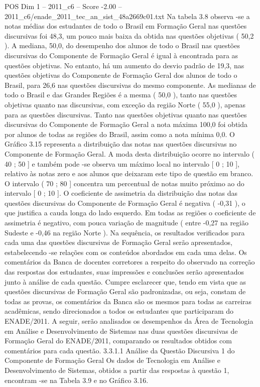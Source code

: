 \begin{textsample}{POS Dim 1 – 2011\_c6 – Score -2.00 – 2011\_c6/enade\_2011\_tec\_an\_sist\_48a2669c01.txt}
Na tabela 3.8 observa -se a notas médias dos estudantes de todo o Brasil em Formação Geral nas questões discursivas foi 48,3, um pouco mais baixa da obtida nas questões objetivas ( 50,2 ).
A mediana, 50,0, do desempenho dos alunos de todo o Brasil nas questões discursivas do Componente de Formação Geral é igual à encontrada para as questões objetivas.
No entanto, há um aumento do desvio padrão de 19,3, nas questões objetivas do Componente de Formação Geral dos alunos de todo o Brasil, para 26,6 nas questões discursivas do mesmo componente.
As medianas de todo o Brasil e das Grandes Regiões é a mesma ( 50,0 ), tanto nas questões objetivas quanto nas discursivas, com exceção da região Norte ( 55,0 ), apenas para as questões discursivas.
Tanto nas questões objetivas quanto nas questões discursivas do Componente de Formação Geral a nota máxima 100,0 foi obtida por alunos de todas as regiões do Brasil, assim como a nota mínima 0,0.
O Gráfico 3.15 representa a distribuição das notas nas questões discursivas no Componente de Formação Geral.
A moda desta distribuição ocorre no intervalo ( 40 ; 50 ] e também pode -se observa um máximo local no intervalo [ 0 ; 10 ], relativo às notas zero e aos alunos que deixaram este tipo de questão em branco.
O intervalo ( 70 ; 80 ] concentra um percentual de notas muito próximo ao do intervalo [ 0 ; 10 ].
O coeficiente de assimetria da distribuição das notas das questões discursivas do Componente de Formação Geral é negativa ( -0,31 ), o que justifica a cauda longa do lado esquerdo.
Em todas as regiões o coeficiente de assimetria é negativo, com pouca variação de magnitude ( entre -0,27 na região Sudeste e -0,46 na região Norte ).
Na sequência, os resultados verificados para cada uma das questões discursivas de Formação Geral serão apresentados, estabelecendo -se relações com os conteúdos abordados em cada uma delas.
Os comentários da Banca de docentes corretores a respeito do observado na correção das respostas dos estudantes, suas impressões e conclusões serão apresentados junto à análise de cada questão.
Cumpre esclarecer que, tendo em vista que as questões discursivas de Formação Geral são padronizadas, ou seja, constam de todas as provas, os comentários da Banca são os mesmos para todas as carreiras acadêmicas, sendo direcionados a todos os estudantes que participaram do ENADE/2011.
A seguir, serão analisados os desempenhos da Área de Tecnologia em Análise e Desenvolvimento de Sistemas nas duas questões discursivas de Formação Geral do ENADE/2011, comparando os resultados obtidos com comentários para cada questão. 3.3.1.1 Análise da Questão Discursiva 1 do Componente de Formação Geral Os dados de Tecnologia em Análise e Desenvolvimento de Sistemas, obtidos a partir das respostas à questão 1, encontram -se na Tabela 3.9 e no Gráfico 3.16.

\end{textsample}
